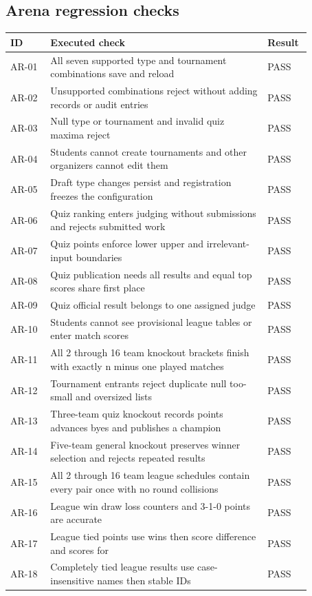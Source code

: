 \subsection*{Arena regression checks}
\small\begin{longtable}{p{0.12\linewidth}p{0.65\linewidth}p{0.1\linewidth}}\toprule ID & Executed check & Result\\\midrule\endhead
AR-01 & All seven supported type and tournament combinations save and reload & PASS\\
AR-02 & Unsupported combinations reject without adding records or audit entries & PASS\\
AR-03 & Null type or tournament and invalid quiz maxima reject & PASS\\
AR-04 & Students cannot create tournaments and other organizers cannot edit them & PASS\\
AR-05 & Draft type changes persist and registration freezes the configuration & PASS\\
AR-06 & Quiz ranking enters judging without submissions and rejects submitted work & PASS\\
AR-07 & Quiz points enforce lower upper and irrelevant-input boundaries & PASS\\
AR-08 & Quiz publication needs all results and equal top scores share first place & PASS\\
AR-09 & Quiz official result belongs to one assigned judge & PASS\\
AR-10 & Students cannot see provisional league tables or enter match scores & PASS\\
AR-11 & All 2 through 16 team knockout brackets finish with exactly n minus one played matches & PASS\\
AR-12 & Tournament entrants reject duplicate null too-small and oversized lists & PASS\\
AR-13 & Three-team quiz knockout records points advances byes and publishes a champion & PASS\\
AR-14 & Five-team general knockout preserves winner selection and rejects repeated results & PASS\\
AR-15 & All 2 through 16 team league schedules contain every pair once with no round collisions & PASS\\
AR-16 & League win draw loss counters and 3-1-0 points are accurate & PASS\\
AR-17 & League tied points use wins then score difference and scores for & PASS\\
AR-18 & Completely tied league results use case-insensitive names then stable IDs & PASS\\

\end{longtable}
